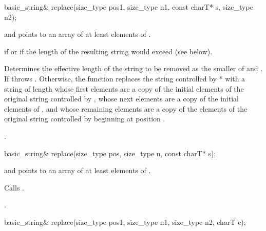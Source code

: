 %
%
\begin{itemdecl}
basic_string&
  replace(size_type pos1, size_type n1, const charT* s, size_type n2);
\end{itemdecl}

\begin{itemdescr}
\pnum
\requires {} and  points to an array of at
least  elements of .

\pnum
\throws {} if  or 
if the length of the resulting string would exceed  (see below).

\pnum
\effects Determines the effective length  of the string to be
removed as the smaller of  and . If
 throws . Otherwise,
the function replaces the string controlled by * with a string of
length  whose first  elements are a copy
of the initial elements of the original string controlled by ,
whose next  elements are a copy of the initial  elements
of , and whose remaining elements are a copy of the elements of the
original string controlled by  beginning at position
.

\pnum
\returns
{}.
\end{itemdescr}

%
%
\begin{itemdecl}
basic_string&
  replace(size_type pos, size_type n, const charT* s);
\end{itemdecl}

\begin{itemdescr}
\pnum
\requires {} and  points to an array of at least
 elements of .

\pnum
\effects Calls .

\pnum
\returns
{}.
\end{itemdescr}

%
%
\begin{itemdecl}
basic_string&
  replace(size_type pos1, size_type n1,
          size_type n2, charT c);
\end{itemdecl}

